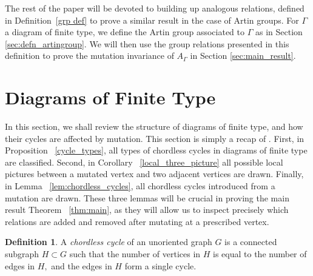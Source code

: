 \documentclass[11pt]{amsart}
\theoremstyle{definition}
\newtheorem{defn}[thm]{Definition}
\begin{document}
The rest of the paper will be devoted to building up analogous relations, defined in Definition~\ref{grp def} to prove a similar result in the case of Artin groups. For $\Gamma$ a diagram of finite type, we define the Artin group associated to $\Gamma$ as in Section \ref{sec:defn_artingroup}. We will then use the group relations presented in this definition to prove the mutation invariance of $A_{\Gamma}$ in Section \ref{sec:main_result}.

\section{Diagrams of Finite Type}
\label{sec:finite-type_diagrams}

In this section, we shall review the structure of diagrams of finite type, and how their cycles are affected by mutation. This section is simply a recap of \cite[Section 2]{BM13}. First, in Proposition ~\ref{cycle_types}, all types of chordless cycles in diagrams of finite type are classified. Second, in Corollary ~\ref{local_three_picture} all possible local pictures between a mutated vertex and two adjacent vertices are drawn. Finally, in Lemma ~\ref{lem:chordless_cycles}, all chordless cycles introduced from a mutation are drawn. These three lemmas will be crucial in proving the main result Theorem ~\ref{thm:main}, as they will allow us to inspect precisely which relations are added and removed after mutating at a prescribed vertex.

\begin{defn}
\label{chordlesscycle}
A {\it chordless cycle} of an unoriented graph $G$ is a connected subgraph $H \subset G$ such that the number of vertices in $H$ is equal to the number of edges in $H,$ and the edges in $H$ form a single cycle.
\end{defn}
\end{document}

